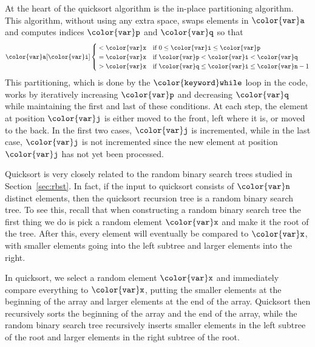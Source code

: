 \documentclass[10pt]{book}
\newcommand{\secref}[1]{Section~\ref{sec:#1}}
\theoremstyle{plain}
\theoremstyle{definition}
\begin{document}
At the heart of the quicksort algorithm is the in-place partitioning
algorithm.  This algorithm, without using any extra space, swaps elements
in \ensuremath{\mathtt{{\color{var}a}}} and computes indices \ensuremath{\mathtt{{\color{var}p}}} and \ensuremath{\mathtt{{\color{var}q}}} so that
\[
   \ensuremath{\mathtt{{\color{var}a}[{\color{var}i}]}} \begin{cases} 
         {}< \ensuremath{\mathtt{{\color{var}x}}} & \text{if $0\le \ensuremath{\mathtt{{\color{var}i}}}\le \ensuremath{\mathtt{{\color{var}p}}}$} \\
         {}= \ensuremath{\mathtt{{\color{var}x}}} & \text{if $\ensuremath{\mathtt{{\color{var}p}}}< \ensuremath{\mathtt{{\color{var}i}}} < \ensuremath{\mathtt{{\color{var}q}}}$} \\
         {}> \ensuremath{\mathtt{{\color{var}x}}} & \text{if $\ensuremath{\mathtt{{\color{var}q}}}\le \ensuremath{\mathtt{{\color{var}i}}} \le \ensuremath{\mathtt{{\color{var}n}}}-1$}
     \end{cases}
\]
This partitioning, which is done by the \ensuremath{\mathtt{{\color{keyword}while}}} loop in the code, works
by iteratively increasing \ensuremath{\mathtt{{\color{var}p}}} and decreasing \ensuremath{\mathtt{{\color{var}q}}} while maintaining the
first and last of these conditions.  At each step, the element at position
\ensuremath{\mathtt{{\color{var}j}}} is either moved to the front, left where it is, or moved to the back.
In the first two cases, \ensuremath{\mathtt{{\color{var}j}}} is incremented, while in the last case, \ensuremath{\mathtt{{\color{var}j}}}
is not incremented since the new element at position \ensuremath{\mathtt{{\color{var}j}}} has not yet been
processed.

Quicksort is very closely related to the random binary search trees
studied in \secref{rbst}.  In fact, if the input to quicksort consists
of \ensuremath{\mathtt{{\color{var}n}}} distinct elements, then the quicksort recursion tree is a random
binary search tree.  To see this, recall that when constructing a random
binary search tree the first thing we do is pick a random element \ensuremath{\mathtt{{\color{var}x}}} and
make it the root of the tree.  After this, every element will eventually
be compared to \ensuremath{\mathtt{{\color{var}x}}}, with smaller elements going into the left subtree
and larger elements into the right.

In quicksort, we select a random element \ensuremath{\mathtt{{\color{var}x}}} and immediately compare
everything to \ensuremath{\mathtt{{\color{var}x}}}, putting the smaller elements at the beginning of
the array and larger elements at the end of the array.  Quicksort then
recursively sorts the beginning of the array and the end of the array,
while the random binary search tree recursively inserts smaller elements
in the left subtree of the root and larger elements in the right subtree
of the root.
\end{document}
